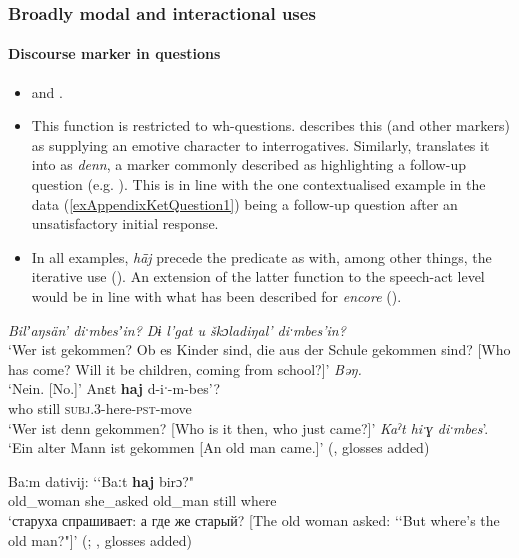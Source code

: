 \subsubsection{Broadly modal and interactional uses}
\paragraph{Discourse marker in questions}\label{appendixKetQuestions}
\begin{itemize}
	\item \textcite{Belimov1976} and \textcite[317]{Werner1997}.
	\item This function is restricted to wh-questions. \textcite{Belimov1976} describes this (and other markers) as supplying an emotive character to interrogatives. Similarly, \textcite{Werner1997} translates it into  as \textit{denn}, a marker commonly described as highlighting a follow-up question (e.g. \cite{Wegener2001}). This is in line with the one contextualised example in the data (\ref{exAppendixKetQuestion1}) being a follow-up question after an unsatisfactory initial response.
	\item In all examples, \textit{hā̄j} precede the predicate as with, among other things, the iterative use (). An extension of the latter function to the speech-act level would be in line with what has been described for  \textit{encore} ().
\end{itemize}

\begin{exe}
\ex\label{exAppendixKetQuestion1}
	\begin{xlist}
	\sloppy
	 \textit{Bilʼaŋsän\rq{} diˑmbesʼin? Dɨ l\rq{}gat u škɔladiŋal\rq{} diˑmbes\rq{}in?}\\
	\lq Wer ist gekommen? Ob es Kinder sind, die aus der Schule gekommen sind? [Who has come? Will it be children, coming from school?]\rq
	 \textit{Bəŋ.}\\
	\lq Nein. [No.]\rq
	\gll Anεt \textbf{haj} d-iˑ-m-bes\rq{}?\\
	who still \textsc{subj}.3-here-\textsc{pst}-move\\
	\glt \lq Wer ist denn gekommen? [Who is it then, who just came?]\rq{ }
	 \textit{Kaˀt hiˑɣ diˑmbes}\rq{}.\\
	\lq Ein alter Mann ist gekommen [An old man came.]\rq{ }(\cite[366–367]{Werner1997}, glosses added)
	\end{xlist}
	
	\ex
	\gll Baːm dativij: \lq\lq Baːt \textbf{haj} birɔ?"\\
	old\_woman she\_asked \phantom{\rq\rq}old\_man still where\\
	\glt \lq старуха спрашивает: а где же старый? [The old woman asked: \lq\lq But where's the old man?"]'
	(\cite[25]{Belimov1976}; \cite[319]{Werner1997}, glosses added)
\end{exe}

